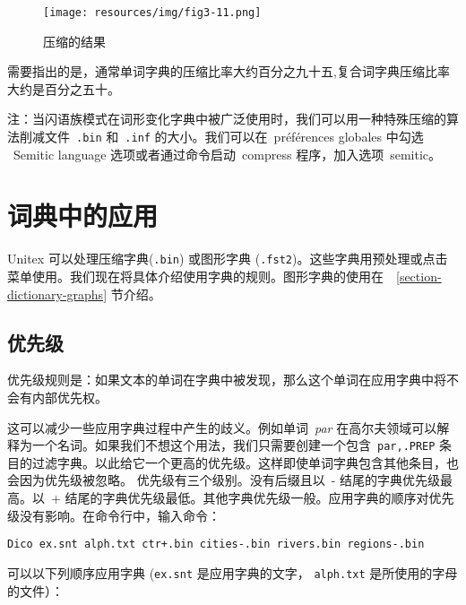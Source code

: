 \bigskip
\begin{figure}[!h]
\begin{center}
\texttt{[image: resources/img/fig3-11.png]}
\caption{压缩的结果\label{fig-compression-result}}
\end{center}
\end{figure}

\bigskip
\noindent 需要指出的是，通常单词字典的压缩比率大约百分之九十五,复合词字典压缩比率大约是百分之五十。

\bigskip
\noindent 注：当闪语族模式在词形变化字典中被广泛使用时，我们可以用一种特殊压缩的算法削减文件\ \verb+.bin+ 和\ \verb+.inf+ 的大小。我们可以在\ préférences globales 中勾选 \ Semitic language 选项或者通过命令启动\ compress 程序，加入选项\ semitic。


\section{词典中的应用}
\label{section-applying-dictionaries}

\bigskip
\noindent 
Unitex 可以处理压缩字典(\verb+.bin+) 或图形字典 (\verb+.fst2+)。这些字典用预处理或点击菜单使用。我们现在将具体介绍使用字典的规则。图形字典的使用在\ ~\ref{section-dictionary-graphs} 节介绍。


\subsection{优先级}
\label{section-dictionary-priorities}
优先级规则是：如果文本的单词在字典中被发现，那么这个单词在应用字典中将不会有内部优先权。


\bigskip
\noindent 
这可以减少一些应用字典过程中产生的歧义。例如单词\ \textit{par} 在高尔夫领域可以解释为一个名词。如果我们不想这个用法，我们只需要创建一个包含\ \verb$par,.PREP$ 条目的过滤字典。以此给它一个更高的优先级。这样即使单词字典包含其他条目，也会因为优先级被忽略。
优先级有三个级别。没有后缀且以\ - 结尾的字典优先级最高。以\ + 结尾的字典优先级最低。其他字典优先级一般。应用字典的顺序对优先级没有影响。在命令行中，输入命令：




\bigskip
\noindent
\verb$Dico ex.snt alph.txt ctr+.bin cities-.bin rivers.bin regions-.bin$

\bigskip \noindent 
可以以下列顺序应用字典 (\verb+ex.snt+ 是应用字典的文字， \verb+alph.txt+ 是所使用的字母的文件）：




